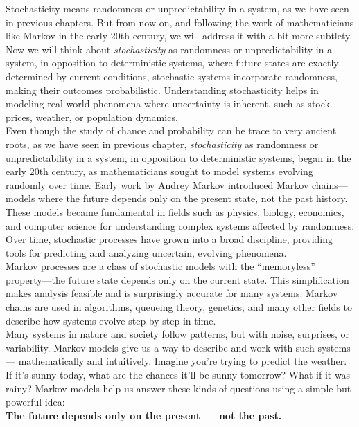\documentclass{book}
\begin{document}
Stochasticity means randomness or unpredictability in a system, as we have seen in previous chapters. But from now on, and following the work of mathematicians like Markov in the early 20th century, we will address it with a bit more subtlety. Now we will think about \textit{stochasticity} as randomness or unpredictability in a system, in opposition to deterministic systems, where future states are exactly determined by current conditions, stochastic systems incorporate randomness, making their outcomes probabilistic. Understanding stochasticity helps in modeling real-world phenomena where uncertainty is inherent, such as stock prices, weather, or population dynamics.\\

Even though the study of chance and probability can be trace to very ancient roots, as we have seen in previous chapter, \textit{stochasticity} as randomness or unpredictability in a system, in opposition to deterministic systems, began in the early 20th century, as mathematicians sought to model systems evolving randomly over time. Early work by Andrey Markov introduced Markov chains—models where the future depends only on the present state, not the past history. These models became fundamental in fields such as physics, biology, economics, and computer science for understanding complex systems affected by randomness. Over time, stochastic processes have grown into a broad discipline, providing tools for predicting and analyzing uncertain, evolving phenomena.\\

Markov processes are a class of stochastic models with the “memoryless” property—the future state depends only on the current state. This simplification makes analysis feasible and is surprisingly accurate for many systems. Markov chains are used in algorithms, queueing theory, genetics, and many other fields to describe how systems evolve step-by-step in time.\\

Many systems in nature and society follow patterns, but with noise, surprises, or variability. Markov models give us a way to describe and work with such systems — mathematically and intuitively. Imagine you're trying to predict the weather. If it’s sunny today, what are the chances it’ll be sunny tomorrow? What if it was rainy? Markov models help us answer these kinds of questions using a simple but powerful idea:\\

\textbf{The future depends only on the present — not the past.}\\
\end{document}
